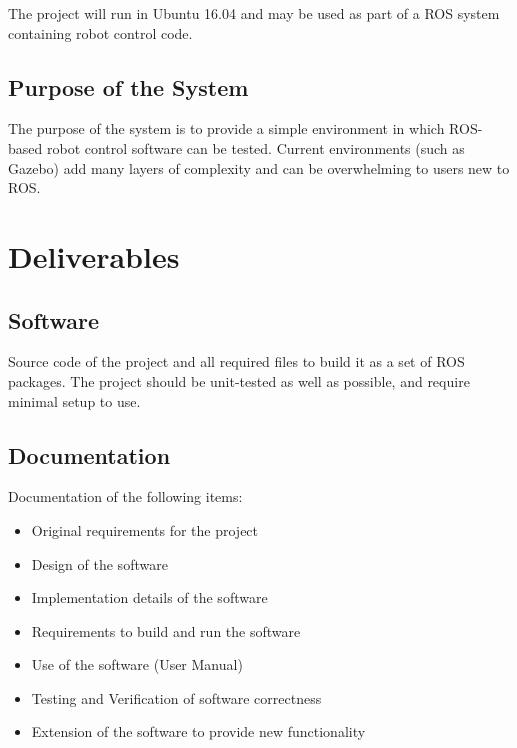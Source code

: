 The project will run in Ubuntu 16.04 and may be used as part of a ROS system containing robot control code.

\subsection{Purpose of the System}
The purpose of the system is to provide a simple environment in which ROS-based robot control software can be tested. Current environments (such as Gazebo) add many layers of complexity and can be overwhelming to users new to ROS.

\section{Deliverables}

\subsection{Software}
Source code of the project and all required files to build it as a set of ROS packages. The project should be unit-tested as well as possible, and require minimal setup to use. 

\subsection{Documentation}
Documentation of the following items:
\begin{itemize}
	\item Original requirements for the project
	\item Design of the software
	\item Implementation details of the software
	\item Requirements to build and run the software
	\item Use of the software (User Manual)
	\item Testing and Verification of software correctness
	\item Extension of the software to provide new functionality
\end{itemize}

